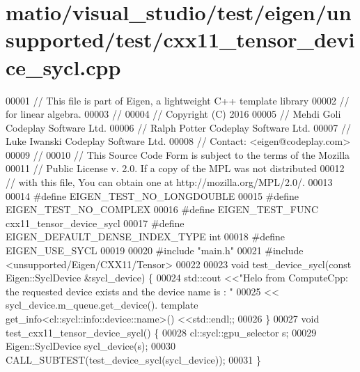 \hypertarget{matio_2visual__studio_2test_2eigen_2unsupported_2test_2cxx11__tensor__device__sycl_8cpp_source}{}\section{matio/visual\+\_\+studio/test/eigen/unsupported/test/cxx11\+\_\+tensor\+\_\+device\+\_\+sycl.cpp}
\label{matio_2visual__studio_2test_2eigen_2unsupported_2test_2cxx11__tensor__device__sycl_8cpp_source}

\begin{DoxyCode}
00001 \textcolor{comment}{// This file is part of Eigen, a lightweight C++ template library}
00002 \textcolor{comment}{// for linear algebra.}
00003 \textcolor{comment}{//}
00004 \textcolor{comment}{// Copyright (C) 2016}
00005 \textcolor{comment}{// Mehdi Goli    Codeplay Software Ltd.}
00006 \textcolor{comment}{// Ralph Potter  Codeplay Software Ltd.}
00007 \textcolor{comment}{// Luke Iwanski  Codeplay Software Ltd.}
00008 \textcolor{comment}{// Contact: <eigen@codeplay.com>}
00009 \textcolor{comment}{//}
00010 \textcolor{comment}{// This Source Code Form is subject to the terms of the Mozilla}
00011 \textcolor{comment}{// Public License v. 2.0. If a copy of the MPL was not distributed}
00012 \textcolor{comment}{// with this file, You can obtain one at http://mozilla.org/MPL/2.0/.}
00013 
00014 \textcolor{preprocessor}{#define EIGEN\_TEST\_NO\_LONGDOUBLE}
00015 \textcolor{preprocessor}{#define EIGEN\_TEST\_NO\_COMPLEX}
00016 \textcolor{preprocessor}{#define EIGEN\_TEST\_FUNC cxx11\_tensor\_device\_sycl}
00017 \textcolor{preprocessor}{#define EIGEN\_DEFAULT\_DENSE\_INDEX\_TYPE int}
00018 \textcolor{preprocessor}{#define EIGEN\_USE\_SYCL}
00019 
00020 \textcolor{preprocessor}{#include "main.h"}
00021 \textcolor{preprocessor}{#include <unsupported/Eigen/CXX11/Tensor>}
00022 
00023 \textcolor{keywordtype}{void} test\_device\_sycl(\textcolor{keyword}{const} Eigen::SyclDevice &sycl\_device) \{
00024   std::cout <<\textcolor{stringliteral}{"Helo from ComputeCpp: the requested device exists and the device name is : "}
00025     << sycl\_device.m\_queue.get\_device(). \textcolor{keyword}{template} get\_info<cl::sycl::info::device::name>() <<std::endl;;
00026 \}
00027 \textcolor{keywordtype}{void} test\_cxx11\_tensor\_device\_sycl() \{
00028   cl::sycl::gpu\_selector s;
00029   Eigen::SyclDevice sycl\_device(s);
00030   CALL\_SUBTEST(test\_device\_sycl(sycl\_device));
00031 \}
\end{DoxyCode}
